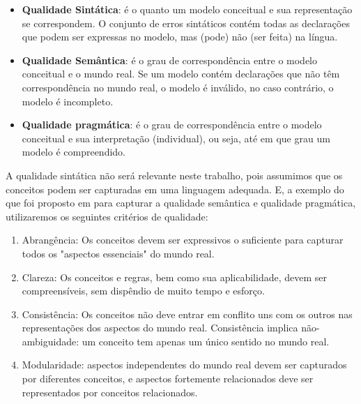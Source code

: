 \begin{itemize}
\item \textbf{Qualidade Sintática}: é o quanto um modelo conceitual e sua representação se correspondem.  O conjunto de erros sintáticos contém todas as declarações que podem ser expressas no modelo, mas (pode) não (ser feita) na língua.\\
\item \textbf{Qualidade Semântica}: é o grau de correspondência entre o modelo conceitual e o mundo real. Se um modelo contém declarações que não têm correspondência no mundo real, o modelo é inválido, no caso contrário, o modelo é incompleto.\\
\item \textbf{Qualidade pragmática}: é o grau de correspondência entre o modelo conceitual e sua interpretação (individual), ou seja, até em que grau um modelo é compreendido.
\end{itemize}

A qualidade sintática não será relevante neste trabalho, pois assumimos que os conceitos podem ser capturadas em uma linguagem adequada. E, a exemplo do que foi proposto em \citep{teeuw:1997.quality} para capturar a qualidade semântica e qualidade pragmática, utilizaremos os seguintes critérios de qualidade:

\begin{enumerate}
\item Abrangência: Os conceitos devem ser expressivos o suficiente para capturar todos os "aspectos essenciais" do mundo real.
\item Clareza: Os conceitos e regras, bem como sua aplicabilidade, devem ser compreensíveis, sem dispêndio de muito tempo e esforço.
\item Consistência: Os conceitos não deve entrar em conflito uns com os outros nas representações dos aspectos do mundo real. Consistência implica não-ambiguidade: um conceito tem apenas um único sentido no mundo real.
\item Modularidade: aspectos independentes do mundo real devem ser capturados por diferentes conceitos, e aspectos fortemente relacionados deve ser representados por conceitos relacionados.
\end{enumerate}

